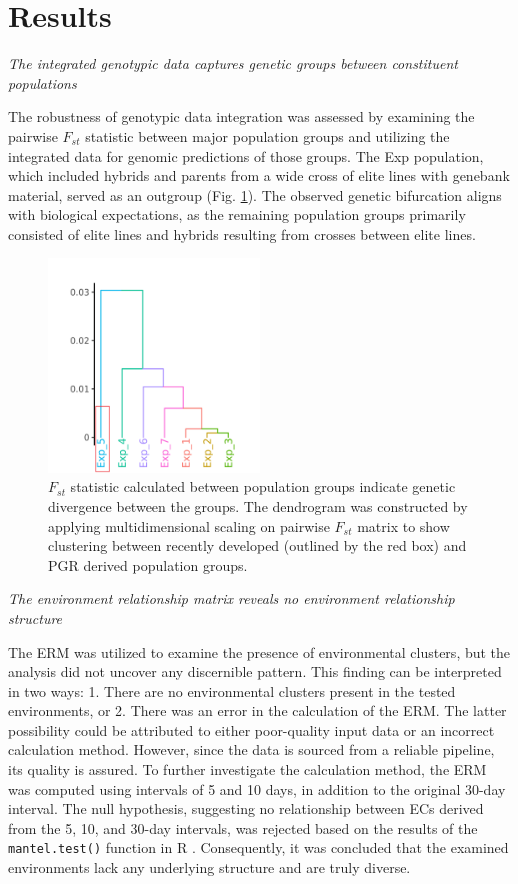 \documentclass[english, biblatex]{lni}
\begin{document}
\section{Results}
\textit{The integrated genotypic data captures genetic groups between constituent populations} 

The robustness of genotypic data integration was assessed by examining the pairwise $F_{st}$ statistic between major population groups and utilizing the integrated data for genomic predictions of those groups. The Exp population, which included hybrids and parents from a wide cross of elite lines with genebank material, served as an outgroup (Fig. \ref{fig_fst_plot}). The observed genetic bifurcation aligns with biological expectations, as the remaining population groups primarily consisted of elite lines and hybrids resulting from crosses between elite lines.

\begin{figure}[h]
    \centering
    \includegraphics[width=0.5\textwidth]{fst_plot}
    \caption{$F_{st}$ statistic calculated between population groups indicate genetic divergence between the groups. The dendrogram was constructed by applying multidimensional scaling on pairwise $F_{st}$ matrix to show clustering between recently developed (outlined by the red box) and PGR derived population groups.}
    \label{fig_fst_plot}
\end{figure}

\textit{The environment relationship matrix reveals no environment relationship structure} 

The ERM was utilized to examine the presence of environmental clusters, but the analysis did not uncover any discernible pattern. This finding can be interpreted in two ways: 1. There are no environmental clusters present in the tested environments, or 2. There was an error in the calculation of the ERM. The latter possibility could be attributed to either poor-quality input data or an incorrect calculation method. However, since the data is sourced from a reliable pipeline, its quality is assured. To further investigate the calculation method, the ERM was computed using intervals of 5 and 10 days, in addition to the original 30-day interval. The null hypothesis, suggesting no relationship between ECs derived from the 5, 10, and 30-day intervals, was rejected based on the results of the \texttt{mantel.test()} function in R \cite{paradis_ape_2019}. Consequently, it was concluded that the examined environments lack any underlying structure and are truly diverse.
\end{document}
